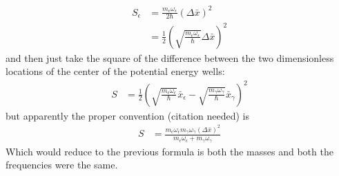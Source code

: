 \begin{align*}
	S_{\epsilon}&= \frac{m_{\epsilon }\omega_{\epsilon}}{2 \hbar} \left(  \Delta \bar{x} \right)^2 \\
	&= \frac{1}{2}\left( \sqrt{\frac{m_{\epsilon }\omega_{\epsilon}}{ \hbar} } \Delta \bar{x} \right)^2
\end{align*}
and then just take the square of the difference between the two dimensionless locations of the center of the potential energy wells:
\begin{align*}
	S &= \frac{1}{2}\left( \sqrt{\frac{m_{\epsilon }\omega_{\epsilon}}{ \hbar} }  \bar{x}_{\epsilon}  - \sqrt{\frac{m_{\gamma }\omega_{\gamma}}{ \hbar} }  \bar{x}_{\gamma}  \right)^2
\end{align*}
but apparently the proper convention (citation needed) is
\begin{align*}
	S &= \frac{m_{\epsilon} \omega_{\epsilon} m_{\gamma }\omega_{\gamma }\left(  \Delta \bar{x} \right)^2 }{m_{\epsilon}  \omega_{\epsilon} +  m_{\gamma } \omega_{\gamma}}
\end{align*}
Which would reduce to the previous formula is both the masses and both the frequencies were the same.

